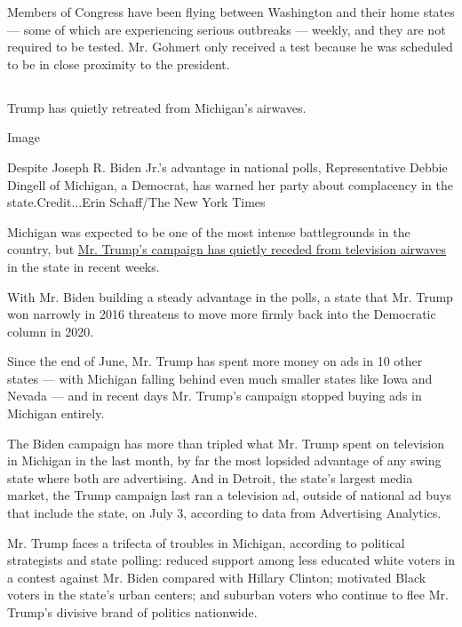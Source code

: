 Members of Congress have been flying between Washington and their home
states --- some of which are experiencing serious outbreaks --- weekly,
and they are not required to be tested. Mr. Gohmert only received a test
because he was scheduled to be in close proximity to the president.

\hypertarget{-5}{%
\subsection{}\label{-5}}

Trump has quietly retreated from Michigan's airwaves.

Image

Despite Joseph R. Biden Jr.'s advantage in national polls,
Representative Debbie Dingell of Michigan, a Democrat, has warned her
party about complacency in the state.Credit...Erin Schaff/The New York
Times

Michigan was expected to be one of the most intense battlegrounds in the
country, but
\href{https://www.nytimes3xbfgragh.onion/2020/07/29/us/politics/michigan-trump-biden-2020.html}{Mr.
Trump's campaign has quietly receded from television airwaves} in the
state in recent weeks.

With Mr. Biden building a steady advantage in the polls, a state that
Mr. Trump won narrowly in 2016 threatens to move more firmly back into
the Democratic column in 2020.

Since the end of June, Mr. Trump has spent more money on ads in 10 other
states --- with Michigan falling behind even much smaller states like
Iowa and Nevada --- and in recent days Mr. Trump's campaign stopped
buying ads in Michigan entirely.

The Biden campaign has more than tripled what Mr. Trump spent on
television in Michigan in the last month, by far the most lopsided
advantage of any swing state where both are advertising. And in Detroit,
the state's largest media market, the Trump campaign last ran a
television ad, outside of national ad buys that include the state, on
July 3, according to data from Advertising Analytics.

Mr. Trump faces a trifecta of troubles in Michigan, according to
political strategists and state polling: reduced support among less
educated white voters in a contest against Mr. Biden compared with
Hillary Clinton; motivated Black voters in the state's urban centers;
and suburban voters who continue to flee Mr. Trump's divisive brand of
politics nationwide.

